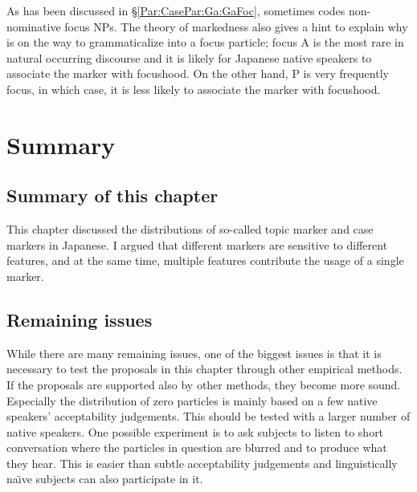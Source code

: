 As has been discussed in \S \ref{Par:CasePar:Ga:GaFoc},
 sometimes codes non-nominative focus NPs.
The theory of markedness also gives a hint to explain why  is on the way to grammaticalize into a focus particle;
focus A is the most rare in natural occurring discourse
and it is likely for Japanese native speakers to associate the marker  with focushood.
On the other hand, P is very frequently focus,
in which case, it is less likely to associate the marker  with focushood.




\section{Summary}

\subsection{Summary of this chapter}

This chapter discussed the distributions of so-called topic marker and case markers in Japanese.
I argued that
different markers are sensitive to different features, and
at the same time,
 multiple features contribute the usage of a single marker.


\subsection{Remaining issues}

While there are many remaining issues,
one of the biggest issues is that
it is necessary to test the proposals in this chapter through other empirical methods.
If the proposals are supported also by other methods,
they become more sound.
Especially the distribution of zero particles is mainly based on a few native speakers' acceptability judgements.
This should be tested with a larger number of native speakers.
One possible experiment is to ask subjects to listen to short conversation where the particles in question are blurred
and to produce what they hear.
This is easier than subtle acceptability judgements and linguistically na\"{\i}ve subjects can also participate in it.

